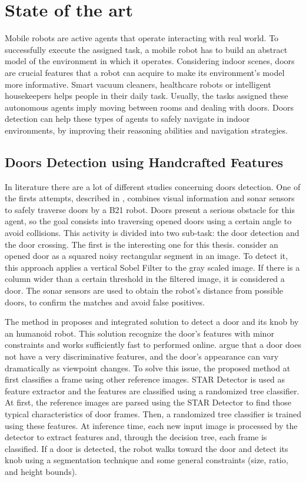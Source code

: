 \chapter{State of the art}
\label{capitolo2}
\thispagestyle{empty}

 Mobile robots are active agents that operate interacting with real world. To successfully execute the assigned task, a mobile robot has to build an abstract model of the environment in which it operates. Considering indoor scenes, doors are crucial features that a robot can acquire to make its environment's model more informative. 
 Smart vacuum cleaners, healthcare robots or intelligent housekeepers helps people in their daily task. Usually, the tasks assigned these autonomous agents imply moving between rooms and dealing with doors.
 Doors detection can help these types of agents to safely navigate in indoor environments, by improving their reasoning abilities and navigation strategies.
 
 \section{Doors Detection using Handcrafted Features}
  In literature there are a lot of different studies concerning doors detection. One of the firsts attempts, described in \cite{sonarandivisualdoordetection}, combines visual information and sonar sensors to safely traverse doors by a B21 robot. Doors present a serious obstacle for this agent, so the goal consists into traversing opened doors using a certain angle to avoid collisions. This activity is divided into two sub-task: the door detection and the door crossing. The first is the interesting one for this thesis. \citeauthor{sonarandivisualdoordetection} consider an opened door as a squared noisy rectangular segment in an image. To detect it, this approach applies a vertical Sobel Filter to the gray scaled image. If there is a column wider than a certain threshold in the filtered image, it is considered a door. The sonar sensors are used to obtain the robot's distance from possible doors, to confirm the matches and avoid false positives. 
  
  The method in \cite{humanoid} proposes and integrated solution to detect a door and its knob by an humanoid robot. This solution recognize the door's features with minor constraints and works sufficiently fast to performed online. \citeauthor{humanoid} argue that a door does not have a very discriminative features, and the door's appearance can vary dramatically as viewpoint changes. To solve this issue, the proposed method at first classifies a frame using other reference images. STAR Detector is used as feature extractor and the features are classified using a randomized tree classifier. At first, the reference images are parsed using the STAR Detector to find those typical characteristics of door frames. Then, a randomized tree classifier is trained using these features. At inference time, each new input image is processed by the detector to extract features and, through the decision tree, each frame is classified. If a door is detected, the robot walks toward the door and detect its knob using a segmentation technique and some general constraints (size, ratio, and height bounds).
  
